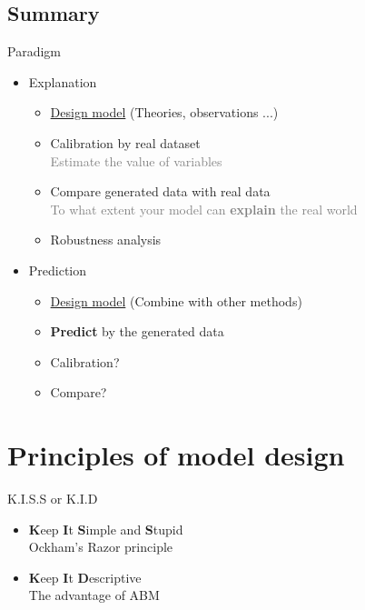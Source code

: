\documentclass[compress]{beamer}
\begin{document}
\subsection{Summary}
\begin{frame}{Paradigm}
    \begin{itemize}
        \item<1-> Explanation
            \begin{itemize}
                \item \underline{Design model} (Theories, observations ...)
                \item Calibration by real dataset
                \\ \textcolor{gray}{Estimate the value of variables}
                \item Compare generated data with real data
                \\ \textcolor{gray}{To what extent your model can \textbf{explain} the real world}
                \item Robustness analysis
            \end{itemize}
        \item<2-> Prediction
            \begin{itemize}
                \item \underline{Design model} (Combine with other methods)
                \item \textbf{Predict} by the generated data
                \item \textcolor{myNewColorA}{Calibration?}
                \item \textcolor{myNewColorA}{Compare?}
            \end{itemize}
    \end{itemize}
\end{frame}

\section{Principles of model design}
\begin{frame}{K.I.S.S or K.I.D}
    \begin{itemize}
        \item<1-> \textcolor{myNewColorA}{\textbf{K}}eep \textcolor{myNewColorA}{\textbf{I}}t \textcolor{myNewColorA}{\textbf{S}}imple and \textcolor{myNewColorA}{\textbf{S}}tupid\\
        Ockham's Razor principle
        \item<2-> \textcolor{myNewColorA}{\textbf{K}}eep \textcolor{myNewColorA}{\textbf{I}}t \textcolor{myNewColorA}{\textbf{D}}escriptive\\
        The advantage of ABM
    \end{itemize}
\end{frame}
\end{document}
